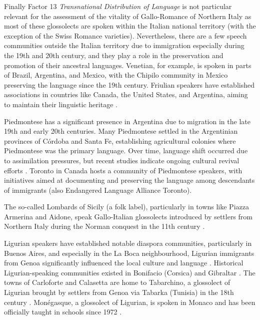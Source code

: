\documentclass[a4paper,11pt]{article}
\begin{document}
Finally Factor 13 \textit{Transnational Distribution of Language} is not particular relevant for the assessment of the vitality of Gallo-Romance of Northern Italy as most of these glossolects are spoken within the Italian national territory (with the exception of the Swiss Romance varieties). Nevertheless, there are a few speech communities outside the Italian territory due to immigration especially during the 19th and 20th century,  and they play a role in the preservation and promotion of their ancestral languages. Venetian, for example, is spoken in parts of Brazil, Argentina, and Mexico, with the Chipilo community in Mexico preserving the language since the 19th century. Friulian speakers have established associations in countries like Canada, the United States, and Argentina, aiming to maintain their linguistic heritage \citep[for example some recent linguistic research on these varieties include][]  {marcato2002dialetti, guzzo2023brazilian, andriania2022documenting, andriani2022d, frasson2021clitics, sbrighi2021language}.

Piedmontese has a significant presence in Argentina due to migration in the late 19th and early 20th centuries. Many Piedmontese settled in the Argentinian provinces of Córdoba and Santa Fe, establishing agricultural colonies where Piedmontese was the primary language. Over time, language shift occurred due to assimilation pressures, but recent studies indicate ongoing cultural revival efforts \citep{goria2024piemontese}. Toronto in Canada hosts a community of Piedmontese speakers, with initiatives aimed at documenting and preserving the language among descendants of immigrants \citep{Villata} (also Endangered Language Alliance Toronto).

The so-called Lombards of Sicily (a folk label), particularly in towns like Piazza Armerina and Aidone, speak Gallo-Italian glossolects introduced by settlers from Northern Italy during the Norman conquest in the 11th century \citep[for example][]{di2024sulla}. 

Ligurian speakers have established notable diaspora communities, particularly in Buenos Aires, and especially in the La Boca neighbourhood, Ligurian immigrants from Genoa significantly influenced the local culture and language \citep{toso2007genovese}. Historical Ligurian-speaking communities existed in Bonifacio (Corsica) and Gibraltar \citep{bottiglioni1932lingua, gallen2024relazioni}. The towns of Carloforte and Calasetta are home to Tabarchino, a glossolect of Ligurian brought by settlers from Genoa via Tabarka (Tunisia) in the 18th century \citep{toso2009tabarchino}. Monégasque, a glossolect of Ligurian, is spoken in Monaco and has been officially taught in schools since 1972 \citep{lusito2025monegasco}.
\end{document}
